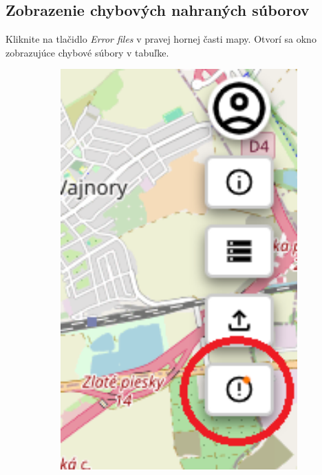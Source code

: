\subsection{Zobrazenie chybových nahraných súborov\label{section:how_to_open_error_files}}
Kliknite na tlačidlo \textit{Error files} v pravej hornej časti mapy. Otvorí sa okno zobrazujúce chybové súbory v tabuľke.
\begin{figure}[H]
    \centering
    \begin{subfigure}{0.2\textwidth}
        \centering
        \includegraphics[width=1\textwidth]{guide_includes/img/show_errors_tool_button.png}

\end{subfigure}
\end{figure}
